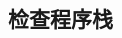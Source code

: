 \documentclass[class=book, crop=false]{standalone}
\begin{document}
\begin{CJK}{UTF8}{gbsn}

\chapter{检查程序栈}













\cleardoublepage

\end{CJK}
\end{document}
